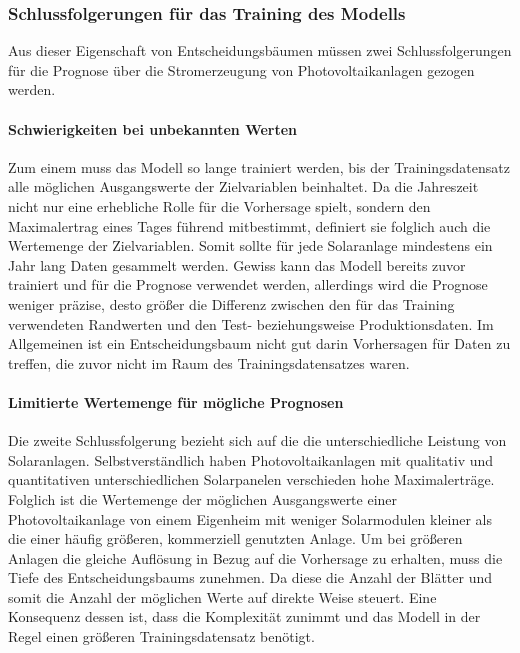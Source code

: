\documentclass[12pt, a4paper]{article}
\begin{document}
\subsubsection{Schlussfolgerungen für das Training des Modells}

Aus dieser Eigenschaft von Entscheidungsbäumen müssen zwei Schlussfolgerungen für die Prognose über die Stromerzeugung von Photovoltaikanlagen gezogen werden. 

\paragraph{Schwierigkeiten bei unbekannten Werten \newline} 

Zum einem muss das Modell so lange trainiert werden, bis der Trainingsdatensatz alle möglichen Ausgangswerte der Zielvariablen beinhaltet. Da die Jahreszeit nicht nur eine erhebliche Rolle für die Vorhersage spielt, sondern den Maximalertrag eines Tages führend mitbestimmt, definiert sie folglich auch die Wertemenge der Zielvariablen. Somit sollte für jede Solaranlage mindestens ein Jahr lang Daten gesammelt werden. Gewiss kann das Modell bereits zuvor trainiert und für die Prognose verwendet werden, allerdings wird die Prognose weniger präzise, desto größer die Differenz zwischen den für das Training verwendeten Randwerten und den Test- beziehungsweise Produktionsdaten. Im Allgemeinen ist ein Entscheidungsbaum nicht gut darin Vorhersagen für Daten zu treffen, die zuvor nicht im Raum des Trainingsdatensatzes waren.

\paragraph{Limitierte Wertemenge für mögliche Prognosen}

Die zweite Schlussfolgerung bezieht sich auf die die unterschiedliche Leistung von Solaranlagen. Selbstverständlich haben Photovoltaikanlagen mit qualitativ und quantitativen unterschiedlichen Solarpanelen verschieden hohe Maximalerträge. Folglich ist die Wertemenge der möglichen Ausgangswerte einer Photovoltaikanlage von einem Eigenheim mit weniger Solarmodulen kleiner als die einer häufig größeren, kommerziell genutzten Anlage. Um bei größeren Anlagen die gleiche Auflösung in Bezug auf die Vorhersage zu erhalten, muss die Tiefe des Entscheidungsbaums zunehmen. Da diese die Anzahl der Blätter und somit die Anzahl der möglichen Werte auf direkte Weise steuert. Eine Konsequenz dessen ist, dass die Komplexität zunimmt und das Modell in der Regel einen größeren Trainingsdatensatz benötigt.
\end{document}
